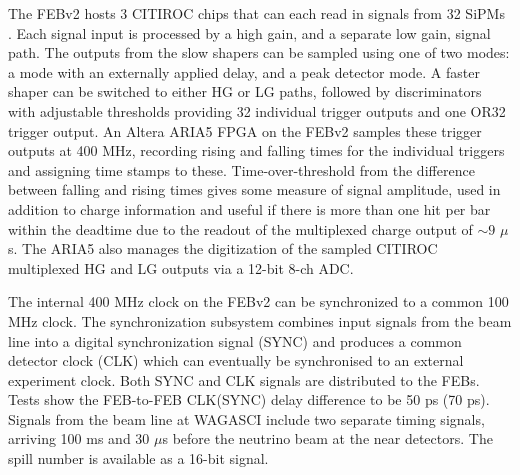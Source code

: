 The FEBv2 hosts 3 CITIROC chips that can each read in signals from 32 SiPMs \cite{Fleury:2014hfa}. Each signal input is processed by a high gain, and a separate low gain, signal path.
The outputs from the slow shapers can be sampled using one of two modes: a mode with an externally applied delay, and a peak detector mode. A faster shaper can be switched to either HG or LG paths, followed by discriminators with adjustable thresholds providing 32 individual trigger outputs and one OR32 trigger output. An Altera ARIA5 FPGA on the FEBv2 samples these trigger outputs at 400 MHz, recording rising and falling times for the individual triggers and assigning time stamps to these. Time-over-threshold from the difference between falling and rising times gives some measure of signal amplitude, used in addition to charge information and useful if there is more than one hit per bar within the deadtime due to the readout of the multiplexed charge output of $\sim9$ $\mu$s. The ARIA5 also manages the digitization of the sampled CITIROC multiplexed HG and LG outputs via a 12-bit 8-ch ADC. 


The internal 400 MHz clock on the FEBv2 can be synchronized to a common 100 MHz clock. The synchronization subsystem combines input signals from the beam line into a digital synchronization signal (SYNC) and produces a common detector clock (CLK) which can eventually be synchronised to an external experiment clock. Both SYNC and CLK signals are distributed to the FEBs. Tests show the FEB-to-FEB CLK(SYNC) delay difference to be 50 ps (70 ps). Signals from the beam line at WAGASCI include two separate timing signals, arriving 100 ms and 30 $\mu$s before the neutrino beam at the near detectors. The spill number is available as a 16-bit signal. 

